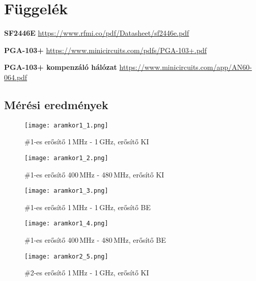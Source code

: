 \section*{Függelék}
\label{sec:fuggelek}

\begin{thebibliography}{1}
	
	 \textbf{SF2446E} \url{https://www.rfmi.co/pdf/Datasheet/sf2446e.pdf}
	
	 \textbf{PGA-103+} \url{https://www.minicircuits.com/pdfs/PGA-103+.pdf}
	
	 \textbf{PGA-103+ kompenzáló hálózat} \url{https://www.minicircuits.com/app/AN60-064.pdf}


\end{thebibliography}

\listoffigures

\newpage

\subsection*{Mérési eredmények}

\begin{figure}[!ht]
	\centering
	\texttt{[image: aramkor1\_1.png]}
	\caption{\#1-es erősítő 1\,MHz - 1\,GHz, erősítő KI}
	\label{fig:meres1}
\end{figure}

\begin{figure}[!ht]
	\centering
	\texttt{[image: aramkor1\_2.png]}
	\caption{\#1-es erősítő 400\,MHz - 480\,MHz, erősítő KI}
	\label{fig:meres2}
\end{figure}

\begin{figure}[!ht]
	\centering
	\texttt{[image: aramkor1\_3.png]}
	\caption{\#1-es erősítő 1\,MHz - 1\,GHz, erősítő BE}
	\label{fig:meres3}
\end{figure}

\begin{figure}[!ht]
	\centering
	\texttt{[image: aramkor1\_4.png]}
	\caption{\#1-es erősítő 400\,MHz - 480\,MHz, erősítő BE}
	\label{fig:meres4}
\end{figure}



\begin{figure}[!ht]
	\centering
	\texttt{[image: aramkor2\_5.png]}
	\caption{\#2-es erősítő 1\,MHz - 1\,GHz, erősítő KI}
	\label{fig:meres5}
\end{figure}

